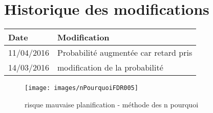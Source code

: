 \section*{Historique des modifications}
\begin{table}[H]
\centering
	\begin{tabularx}{16.8cm}{|X|X|}
	\hline
	\rowcolor{gray!40} Date & Modification \\
	\hline
	 11/04/2016 & Probabilité augmentée car retard pris \\
	\hline
	 14/03/2016 & modification de la probabilité\\
	\hline
	\end{tabularx}
\end{table}
\newpage

\begin{figure}
	\centering
	\texttt{[image: images/nPourquoiFDR005]}
	\caption{\label{risque perte de document}risque mauvaise planification - méthode des n pourquoi}
\end{figure}

